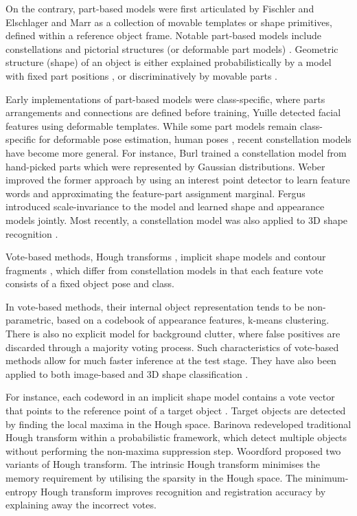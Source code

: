 On the contrary, part-based models were first articulated by Fischler and Elschlager \cite{Fischler1973} and Marr \cite{Marr1982} as a collection of movable templates or shape primitives, defined within a reference object frame. Notable part-based models include constellations \cite{Weber2000, Fergus2007} and pictorial structures (or deformable part models) \cite{Felzenszwalb2005}. Geometric structure (shape) of an object is either explained probabilistically by a model with fixed part positions \cite{Fergus2007}, or discriminatively by movable parts \cite{Yuille1989, Felzenszwalb2005}.

Early implementations of part-based models were class-specific, where parts arrangements and connections are defined before training, \eg Yuille \etal \cite{Yuille1989} detected facial features using deformable templates. While some part models remain class-specific for deformable pose estimation, \eg human poses \cite{Yang2011, Eichner2012}, recent constellation models have become more general. For instance, Burl \etal \cite{Burl1998} trained a constellation model from hand-picked parts which were represented by Gaussian distributions. Weber \etal \cite{Weber2000} improved the former approach by using an interest point detector \cite{Kadir2001} to learn feature words and approximating the feature-part assignment marginal. Fergus \etal \cite{Fergus2007} introduced scale-invariance to the model and learned shape and appearance models jointly. Most recently, a constellation model was also applied to 3D shape recognition \cite{Prasad2011}.

Vote-based methods, \eg Hough transforms \cite{Barinova2010, Woodford2013}, implicit shape models \cite{Leibe2008} and contour fragments \cite{Shotton2008a}, which differ from constellation models in that each feature vote consists of a fixed object pose and class. 

In vote-based methods, their internal object representation tends to be non-parametric, based on a codebook of appearance features, \eg k-means clustering. There is also no explicit model for background clutter, where false positives are discarded through a majority voting process. Such characteristics of vote-based methods allow for much faster inference at the test stage. They have also been applied to both image-based \cite{Leibe2008, Shotton2008, Barinova2010} and 3D shape classification \cite{Flitton2010,  Knopp2010, Pham2011, Woodford2013}. 

For instance, each codeword in an implicit shape model contains a vote vector that points to the reference point of a target object \cite{Leibe2008}. Target objects are detected by finding the local maxima in the Hough space. Barinova \etal \cite{Barinova2010} redeveloped traditional Hough transform within a probabilistic framework, which detect multiple objects without performing the non-maxima suppression step. Woordford \etal \cite{Woodford2013} proposed two variants of Hough transform. The intrinsic Hough transform minimises the memory requirement by utilising the sparsity in the Hough space. The minimum-entropy Hough transform improves recognition and registration accuracy by explaining away the incorrect votes.


